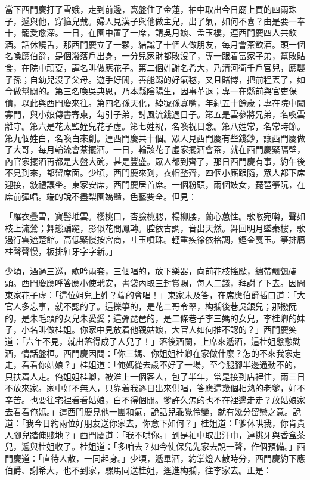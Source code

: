 \begin{showcontents}{}
當下西門慶打了雪娥，走到前邊，窩盤住了金蓮，袖中取出今日廟上買的四兩珠子，遞與他，穿箍兒戴。婦人見漢子與他做主兒，出了氣，如何不喜？由是要一奉十，寵愛愈深。一日，在園中置了一席，請吳月娘、孟玉樓，連西門慶四人共飲酒。話休饒舌，那西門慶立了一夥，結識了十個人做朋友，每月會茶飲酒。頭一個名喚應伯爵，是個潑落戶出身，一分兒家財都敗沒了，專一跟着富家子弟，幫敗貼食，在院中頑耍，諢名叫做應花子。第二個姓謝名希大，乃清河衛千戶官兒，應襲子孫；自幼兒沒了父母。遊手好閒，善能踢的好氣毬，又且賭博，把前程丟了，如今做幫閒的。第三名喚吳典恩，乃本縣陰陽生，因事革退；專一在縣前與官吏保債，以此與西門慶來往。第四名孫天化，綽號孫寡嘴，年紀五十餘歲；專在院中闖寡門，與小娘傳書寄柬，勾引子弟，討風流錢過日子。第五是雲參將兄弟，名喚雲離守。第六是花太監姪兒花子虛。第七姓祝，名喚祝日念。第八姓常，名常時節。第九個姓白，名喚白來創。連西門慶共十個。眾人見西門慶有些錢鈔，讓西門慶做了大哥，每月輪流會茶擺酒。一日，輪該花子虛家擺酒會茶，就在西門慶緊隔壁，內官家擺酒再都是大盤大碗，甚是豐盛。眾人都到齊了，那日西門慶有事，約午後不見到來，都留席面。少頃，西門慶來到，衣帽整齊，四個小廝跟隨，眾人都下席迎接，敍禮讓坐。東家安席，西門慶居首席。一個粉頭，兩個妓女，琵琶箏阮，在席前彈唱。端的說不盡梨園嬌豔，色藝雙全。但見：

「羅衣疊雪，寶髻堆雲。櫻桃口，杏臉桃腮，楊柳腰，蘭心蕙性。歌喉宛囀，聲如枝上流鶯；舞態蹁躚，影似花間鳳轉。腔依古調，音出天然。舞回明月墜秦樓，歌遏行雲遮楚館。高低緊慢按宮商，吐玉噴珠。輕重疾徐依格調，鏗金戛玉。箏排鴈柱聲聲慢，板排紅牙字字新。」

少頃，酒過三巡，歌吟兩套，三個唱的，放下樂器，向前花枝搖颭，繡帶飄颻磕頭。西門慶應呼答應小使玳安，書袋內取三封賞賜，每人二錢，拜謝了下去。因問東家花子虛：「這位姐兒上姓？端的會唱！」東家未及答，在席應伯爵插口道：「大官人多忘事，就不認的了。這擽箏的，是花二哥令翠，构攔後巷吳銀兒；那撥阮的，是朱毛頭的女兒朱愛愛；這彈琵琶的，是二條巷子李三媽的女兒，李桂卿的妹子，小名叫做桂姐。你家中見放着他親姑娘，大官人如何推不認的？」西門慶笑道：「六年不見，就出落得成了人兒了！」落後酒闌，上席來遞酒，這桂姐慇懃勸酒，情話盤桓。西門慶因問：「你三媽、你姐姐桂卿在家做什麼？怎的不來我家走走，看看你姑娘？」桂姐道：「俺媽從去歲不好了一場，至今腿腳半邊通動不的，只扶着人走。俺姐姐桂卿，被淮上一個客人，包了半年，常是接到店裡住，兩三日不放來家。家中好不無人，只靠着我逐日出來供唱，答應這幾個相熟的老爹，好不辛苦。也要往宅裡看看姑娘，白不得個閒。爹許久怎的也不在裡邊走走？放姑娘家去看看俺媽。」這西門慶見他一團和氣，說話兒乖覺伶變，就有幾分留戀之意。說道：「我今日約兩位好朋友送你家去，你意下如何？」桂姐道：「爹休哄我，你肯貴人腳兒踏俺賤地？」西門慶道：「我不哄你。」到是袖中取出汗巾，連挑牙與香盒茶兒，遞與桂姐收了。桂姐道：「多咱去？如今使保兒先家去說一聲，作個預備。」西門慶道：「直待人散，一同起身。」少頃，遞畢酒，約掌燈人散時分，西門慶約下應伯爵、謝希大，也不到家，騾馬同送桂姐，逕進构攔，往李家去。正是：


\end{showcontents}
